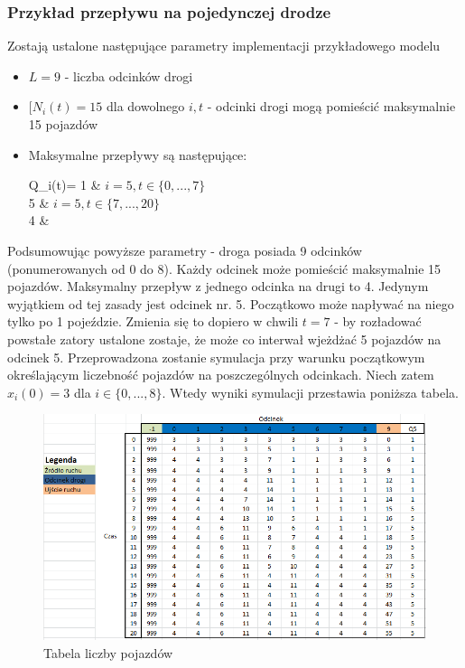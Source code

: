 \documentclass[12pt]{book}
\theoremstyle{plain}
\begin{document}
\subsubsection*{Przykład przepływu na pojedynczej drodze}
Zostają ustalone następujące parametry implementacji przykładowego modelu
\begin{itemize}
	\item $L=9$ - liczba odcinków drogi
	\item $[N_i(t)=15$ dla dowolnego $i,t$ - odcinki drogi mogą pomieścić maksymalnie 15 pojazdów
	\item Maksymalne przepływy są następujące: \begin{numcases}{Q_i(t)=}
	1 &  $i=5, t\in \{0,...,7\}$ \\ 
	5 &  $i=5, t\in \{7,...,20\}$ \\ 	
	4 & 
	\end{numcases}
\end{itemize}
Podsumowując powyższe parametry - droga posiada 9 odcinków (ponumerowanych od 0 do 8). Każdy odcinek może pomieścić maksymalnie 15 pojazdów. Maksymalny przepływ z jednego odcinka na drugi to 4. Jedynym wyjątkiem od tej zasady jest odcinek nr. 5. Początkowo może napływać na niego tylko po 1 pojeździe. Zmienia się to dopiero w chwili $t=7$ - by rozładować powstałe zatory ustalone zostaje, że może co interwał wjeżdżać 5 pojazdów na odcinek 5. Przeprowadzona zostanie symulacja przy warunku początkowym określającym liczebność pojazdów na poszczególnych odcinkach. Niech zatem $x_i(0)=3$ dla $i \in \{0,...,8\}$. Wtedy wyniki symulacji przestawia poniższa tabela.
\begin{figure}[H]
	\centering
	\includegraphics[width=14cm]{images/ctm_przyklad}
	\caption{Tabela liczby pojazdów}
	\label{fig:ctm_przyklad}\end{figure}
\end{document}
